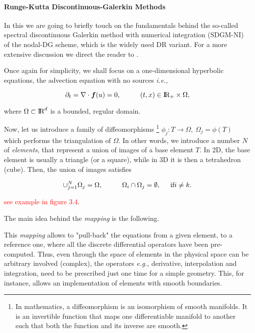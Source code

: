 \paragraph{Runge-Kutta Discontinuous-Galerkin Methods}



In this  we are going to briefly touch on the fundamentals behind the so-called spectral discontinuous Galerkin method with numerical integration (SDGM-NI) of the nodal-DG scheme, which is the widely used DR variant. 
For a more extensive discussion we direct the reader to \cite{Hesthaven:2007}. 

Once again for simplicity, we shall focus on a one-dimensional hyperbolic equations, the advection equation with no sources \textit{i.e.,}

\begin{equation}
\partial_t = \nabla\cdot\boldsymbol{f}(u) =0, \hspace{10mm} (t,x)\in \text{I\!R}_{+} \times\Omega,
\label{eq:theory:dg:adveq}
\end{equation}

where $\Omega\subset \text{I\!R}^{d}$ is a bounded, regular domain. 

Now, let us introduce a family of diffeomorphisms
\footnote{
    In mathematics, a diffeomorphism is an isomorphism of smooth manifolds. It is an invertible function that maps one differentiable manifold to another such that both the function and its inverse are smooth.
} 
$\phi_{j}: T\rightarrow\Omega,\:\Omega_{j}=\phi(T)$ which performs the triangulation of $\Omega$. 
In other words, we introduce a number $N$ of \textit{elements}, that represent a union of images of a base element $T$. 
In 2D, the base element is usually a triangle (or a square), while in 3D it is then a tetrahedron (cube). 
Then, the union of images satisfies

\begin{equation}
\cup_{j=1}^{N}\Omega_{j} = \Omega, \hspace{10mm} \Omega_{i}\cap\Omega_{j} = \emptyset, \hspace{5mm} \text{if} i\neq k.
\end{equation}

\textcolor{red}{see example in figure 3.4}. 

The main idea behind the \textit{mapping} is the following. 

This \textit{mapping} allows to "pull-back" the equations from a given element, to a reference one, where all the discrete differential operators have been pre-computed. Thus, even through the space of elements in the physical space can be arbitrary involved (complex), the operators \textit{e.g.,} derivative, interpolation and integration, need to be prescribed just one time for a simple geometry. 
This, for instance, allows an implementation of elements with smooth boundaries. 

